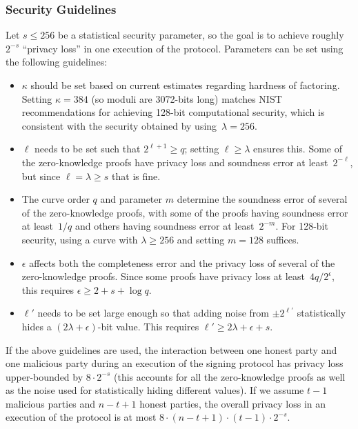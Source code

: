 \documentclass[11pt]{article}
\newcommand{\?}[1]{\stackrel{?}{#1}}
\begin{document}
\subsubsection{Security Guidelines}
Let $s\leq 256$ be a statistical security parameter, so the goal is to achieve roughly $2^{-s}$ 
``privacy loss'' in one execution of the protocol. %
Parameters can be set using the following guidelines: 
\begin{itemize}
    \item $\kappa$ should be set based on current estimates regarding hardness of factoring. 
    Setting $\kappa=384$ (so moduli are 3072-bits long) matches NIST recommendations for achieving 128-bit computational security, which is consistent with the security obtained by using~$\lambda=256$.
    
    \item $\ell$ needs to be set such that $2^{\ell+1}\geq q$; setting $\ell \geq \lambda$ ensures this.
Some of the zero-knowledge proofs have privacy loss and soundness error at least~$2^{-\ell}$, but since $\ell = \lambda \geq s$ that is fine.
    
    \item The curve order $q$ and parameter $m$ determine the soundness error of several of the zero-knowledge proofs, with some of the proofs having soundness error at least~$1/q$ and others having soundness error at least~$2^{-m}$.
    For 128-bit security, using a curve with $\lambda \geq 256$ and setting $m=128$ suffices.
    
    \item $\epsilon$ affects both the completeness error and the privacy loss of several of the zero-knowledge proofs. 
    Since 
    some proofs have privacy loss at least~$4q/2^\epsilon$, this requires $\epsilon \geq 2+s+\log q$.

    \item $\ell'$ needs to be set large enough so that adding noise from $\pm 2^{\ell'}$ statistically hides a $(2\lambda+\epsilon)$-bit value. This requires $\ell' \geq 2\lambda + \epsilon + s$.
\end{itemize}
If the above guidelines are used, 
the interaction between one honest party and one malicious party during an execution of the signing protocol has privacy loss upper-bounded by $8 \cdot 2^{-s}$ (this accounts for all the zero-knowledge proofs as well as the noise used for statistically hiding different values). 
If we assume $t-1$ malicious parties and $n-t+1$ honest parties, the overall privacy loss in an execution of the protocol is at most $8\cdot (n-t+1)\cdot (t-1) \cdot 2^{-s}$.
\end{document}
